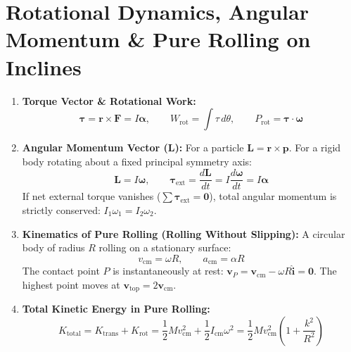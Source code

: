 \documentclass[10pt,a4paper]{article}
\begin{document}
\section{Rotational Dynamics, Angular Momentum \& Pure Rolling on Inclines}

\begin{conceptbox}
\begin{enumerate}[leftmargin=*]
  \item \textbf{Torque Vector \& Rotational Work:}
  \begin{equation}
    \boldsymbol{\tau} = \mathbf{r} \times \mathbf{F} = I\boldsymbol{\alpha}, \qquad W_{\text{rot}} = \int \tau\,d\theta, \qquad P_{\text{rot}} = \boldsymbol{\tau} \cdot \boldsymbol{\omega}
  \end{equation}
  \item \textbf{Angular Momentum Vector ($\mathbf{L}$):} For a particle $\mathbf{L} = \mathbf{r}\times\mathbf{p}$. For a rigid body rotating about a fixed principal symmetry axis:
  \begin{equation}
    \mathbf{L} = I\boldsymbol{\omega}, \qquad \boldsymbol{\tau}_{\text{ext}} = \frac{d\mathbf{L}}{dt} = I\frac{d\boldsymbol{\omega}}{dt} = I\boldsymbol{\alpha}
  \end{equation}
  If net external torque vanishes ($\sum \boldsymbol{\tau}_{\text{ext}} = \mathbf{0}$), total angular momentum is strictly conserved: $I_1 \omega_1 = I_2 \omega_2$.
  \item \textbf{Kinematics of Pure Rolling (Rolling Without Slipping):}
  A circular body of radius $R$ rolling on a stationary surface:
  \begin{equation}
    v_{\text{cm}} = \omega R, \qquad a_{\text{cm}} = \alpha R
  \end{equation}
  The contact point $P$ is instantaneously at rest: $\mathbf{v}_P = \mathbf{v}_{\text{cm}} - \omega R\hat{\mathbf{i}} = \mathbf{0}$. The highest point moves at $\mathbf{v}_{\text{top}} = 2\mathbf{v}_{\text{cm}}$.
  \item \textbf{Total Kinetic Energy in Pure Rolling:}
  \begin{equation}
    K_{\text{total}} = K_{\text{trans}} + K_{\text{rot}} = \frac{1}{2}M v_{\text{cm}}^2 + \frac{1}{2}I_{\text{cm}}\omega^2 = \frac{1}{2}M v_{\text{cm}}^2\left(1 + \frac{k^2}{R^2}\right)
  \end{equation}
\end{enumerate}
\end{conceptbox}
\end{document}
